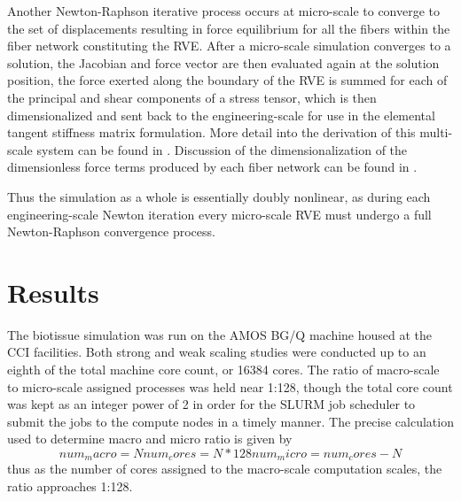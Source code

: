 \documentclass[11pt]{siamltex1213}
\begin{document}
Another Newton-Raphson iterative process occurs at micro-scale to converge to the set of displacements resulting in force equilibrium for all the fibers within the fiber network constituting the RVE. After a micro-scale simulation converges to a solution, the Jacobian and force vector are then evaluated again at the solution position, the force exerted along the boundary of the RVE is summed for each of the principal and shear components of a stress tensor, which is then dimensionalized and sent back to the engineering-scale for use in the elemental tangent stiffness matrix formulation. More detail into the derivation of this multi-scale system can be found in \cite{stylianopoulos2008thesis} \cite{agoram2001coupled} \cite{stylianopoulos2007multiscale} . Discussion of the dimensionalization of the dimensionless force terms produced by each fiber network can be found in \cite{stylianopoulos2007volume} \cite{chandran2007deterministic}.


Thus the simulation as a whole is essentially doubly nonlinear, as during each engineering-scale Newton iteration every micro-scale RVE must undergo a full Newton-Raphson convergence process. 

\section{Results}\label{results}
The biotissue simulation was run on the AMOS BG/Q machine housed at the CCI facilities. Both strong and weak scaling studies were conducted up to an eighth of the total machine core count, or 16384 cores. The ratio of macro-scale to micro-scale assigned processes was held near 1:128, though the total core count was kept as an integer power of 2 in order for the SLURM job scheduler to submit the jobs to the compute nodes in a timely manner. The precise calculation used to determine macro and micro ratio is given by 
$$ 
num_macro = N 
num_cores = N*128
num_micro = num_cores - N
$$
thus as the number of cores assigned to the macro-scale computation scales, the ratio approaches 1:128. 
\end{document}
